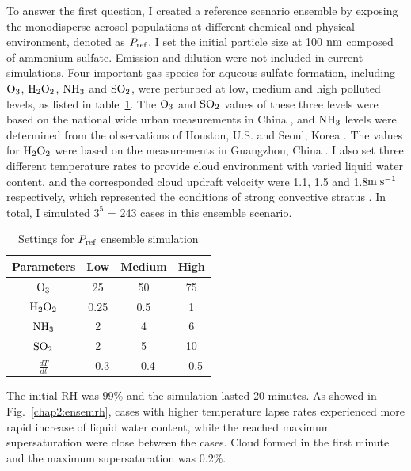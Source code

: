 \documentclass[edeposit,fullpage]{uiucthesis2009}
\makeatletter
\DeclareRobustCommand*\unit[1]
 {\ensuremath{%
   {\thinmuskip3mu\relax
    \def\mu{\text{\textmu}}\def~{\,}%
    \ifx\f@series\testbx\mathbf{#1}\else\mathrm{#1}\fi}}}
\makeatother
\begin{document}
To answer the first question, I created a reference scenario ensemble by exposing the monodisperse aerosol populations at different chemical and physical environment, denoted as $P_{\rm ref}$. I set the initial particle size at 100 \unit{nm} composed of ammonium sulfate. Emission and dilution were not included in current simulations. Four important gas species for aqueous sulfate formation, including $\rm O_3$, $\rm H_2O_2$, $\rm NH_3$ and $\rm SO_2$, were perturbed at low, medium and high polluted levels, as listed in table~\ref{TMI-setting}. The $\rm O_3$ and $\rm SO_2$ values of these three levels were based on the national wide urban measurements in China \citep{wang2014spatial}, and $\rm NH_3$ levels were determined from the observations of Houston, U.S. \citep{nowak2010airborne} and Seoul, Korea \citep{phan2013analysis}. The values for $\rm H_2O_2$ were based on the measurements in Guangzhou, China \citep{hua2008atmospheric}. I also set three different temperature rates to provide cloud environment with varied liquid water content, and the corresponded cloud updraft velocity were 1.1, 1.5 and 1.8\unit{m\;s^{-1}} respectively, which represented the conditions of strong convective stratus \citep{peng2005importance}. In total, I simulated $3^5$ = 243 cases in this ensemble scenario.

\begin{table}[ht]
\centering
\caption{Settings for $P_{\rm ref}$ ensemble simulation}
\label{TMI-setting}
\begin{tabular}{c  c c  c}
\hline
Parameters & Low  & Medium & High\\
\hline
$\rm O_3$& 25 & 50 & 75 \\
$\rm H_2O_2$& 0.25 & 0.5 &  1\\
$\rm NH_3$ &2 & 4 & 6 \\
$\rm SO_2$&2&5& 10\\
$\frac{dT}{dt}$ &$-$0.3 &$ -$0.4&$-$0.5\\
\hline
\end{tabular}
\end{table}

The initial RH was 99\% and the simulation lasted 20 minutes. As showed in Fig.~\ref{chap2:ensemrh}, cases with higher temperature lapse rates experienced more rapid increase of liquid water content, while the reached maximum supersaturation were close between the cases. Cloud formed in the first minute and the maximum supersaturation was 0.2\%. 
\end{document}
